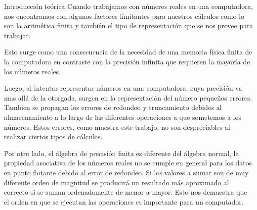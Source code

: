 \begin{section}{Introducción teórica}
	Cuando trabajamos con números reales en una computadora,
	nos encontramos con algunos factores limitantes para nuestros cálculos
	como lo son la aritmética finita y
	también el tipo de representación que se nos provee para trabajar.

	Esto surge como una consecuencia de la necesidad
	de una memoria física finita de la computadora
	en contraste con la precisión infinita
	que requieren la mayoría de los números reales.

	Luego, al intentar representar números en una computadora,
	cuya precisión va mas allá de la otorgada,
	surgen en la representación del número pequeños errores.
	Tambien se propagan los errores de redondeo y truncamiento debidos al almacenamiento a lo largo 
	de las diferentes operaciones a que sometemos a los números.
	Estos errores, como muestra este trabajo, no son despreciables
	al realizar ciertos tipos de cálculos.
	
	Por otro lado, el álgebra de precisión finita es diferente del álgebra normal, la propiedad asociativa
	de los números reales no se cumple en general para los datos en punto flotante debido al error de redondeo.
	Si los valores a sumar son de muy diferente orden de magnitud se producirá un resultado más aproximado al
	correcto si se suman ordenadamente de menor a mayor. Esto nos demuestra que el orden en que se ejecutan las
	operaciones es importante para un computador.
\end{section}
